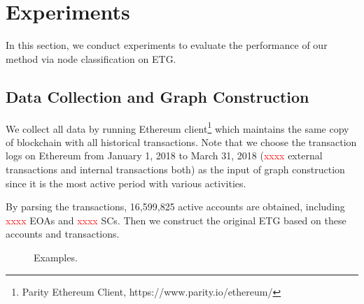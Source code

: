 
\section{Experiments}
In this section, we conduct experiments to evaluate the performance of our method via node classification on ETG.

\subsection{Data Collection and Graph Construction}
We collect all data by running Ethereum client\footnote{Parity Ethereum Client, https://www.parity.io/ethereum/} which maintains the same copy of blockchain with all historical transactions. Note that we choose the transaction logs on Ethereum from January 1, 2018 to March 31, 2018 (\textcolor{red}{xxxx} external transactions and internal transactions both) as the input of graph construction since it is the most active period with various activities.

By parsing the transactions, 16,599,825 active accounts are obtained, including \textcolor{red}{xxxx} EOAs and \textcolor{red}{xxxx} SCs. Then we construct the original ETG based on these accounts and transactions.

\begin{figure}[htbp]
	\centering
	\caption{Examples.}
\end{figure}

